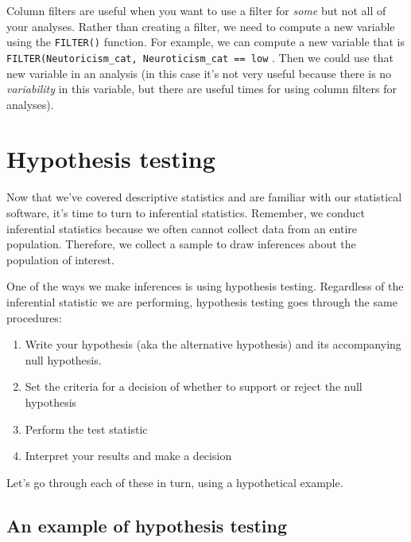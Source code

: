 \documentclass[
]{book}
\providecommand{\tightlist}{%
  \setlength{\itemsep}{0pt}\setlength{\parskip}{0pt}}
\begin{document}
Column filters are useful when you want to use a filter for \emph{some} but not all of your analyses. Rather than creating a filter, we need to compute a new variable using the \texttt{FILTER()} function. For example, we can compute a new variable that is \texttt{FILTER(Neutoricism\_cat,\ Neuroticism\_cat\ ==\ \textquotesingle{}low\textquotesingle{}} . Then we could use that new variable in an analysis (in this case it's not very useful because there is no \emph{variability} in this variable, but there are useful times for using column filters for analyses).

\hypertarget{hypothesis-testing}{%
\chapter{Hypothesis testing}\label{hypothesis-testing}}

Now that we've covered descriptive statistics and are familiar with our statistical software, it's time to turn to inferential statistics. Remember, we conduct inferential statistics because we often cannot collect data from an entire population. Therefore, we collect a sample to draw inferences about the population of interest.

One of the ways we make inferences is using hypothesis testing. Regardless of the inferential statistic we are performing, hypothesis testing goes through the same procedures:

\begin{enumerate}
\def\labelenumi{\arabic{enumi}.}
\tightlist
\item
  Write your hypothesis (aka the alternative hypothesis) and its accompanying null hypothesis.
\item
  Set the criteria for a decision of whether to support or reject the null hypothesis
\item
  Perform the test statistic
\item
  Interpret your results and make a decision
\end{enumerate}

Let's go through each of these in turn, using a hypothetical example.

\hypertarget{an-example-of-hypothesis-testing}{%
\section{An example of hypothesis testing}\label{an-example-of-hypothesis-testing}}
\end{document}
